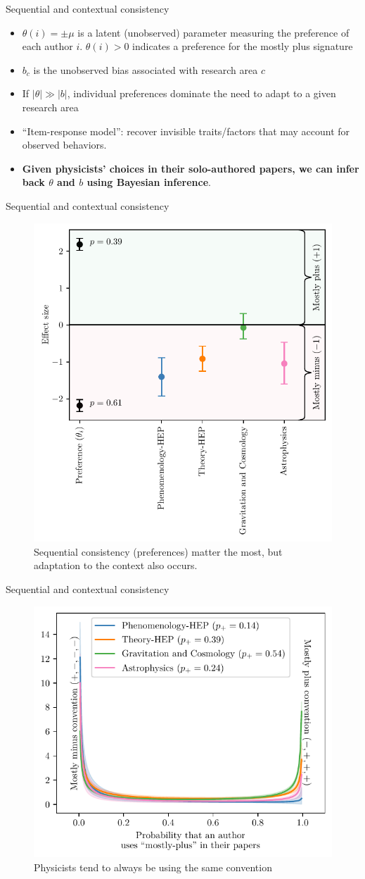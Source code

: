 \documentclass[10pt]{beamer}
\begin{document}
\begin{frame}{Sequential and contextual consistency}
\begin{itemize}
    \item<2-> $\theta(i)=\pm \mu$ is a latent (unobserved) parameter measuring the preference of each author $i$. $\theta(i)>0$ indicates a preference for the mostly plus signature
    \item<3-> $b_c$ is the unobserved bias associated with research area $c$
    \item<4-> If $|\theta|\gg |b|$, individual preferences dominate the need to adapt to a given research area
    \item<5-> ``Item-response model'': recover invisible traits/factors that may account for observed behaviors.
    \item<6-> \textbf{Given physicists' choices in their solo-authored papers, we can infer back $\theta$ and $b$ using Bayesian inference}.
\end{itemize}
\end{frame}

\begin{frame}{Sequential and contextual consistency}
\vspace{-1em}
\begin{figure}
\centering
\includegraphics[width=0.5\linewidth]{consistency_vs_task_simple.pdf}
    \vspace{-0.75em}
    \caption{Sequential consistency (preferences) matter the most, but adaptation to the context also occurs.}
\end{figure}
\end{frame}

\begin{frame}{Sequential and contextual consistency}
\begin{figure}
\centering
\includegraphics[width=0.5\linewidth]{preferences.pdf}
    \caption{Physicists tend to always be using the same convention}
\end{figure}
\end{frame}
\end{document}
